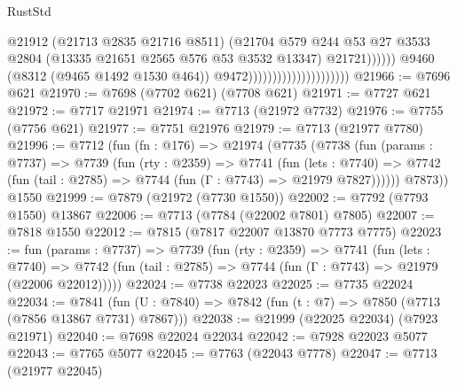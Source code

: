 \begin{lexlean}{RustStd}
\begin{coremodule}
                                                        @21912
                                                        (@21713 @2835 @21716 @8511)
                                                        (@21704
                                                          @579
                                                          @244
                                                          @53
                                                          @27
                                                          @3533
                                                          @2804
                                                          (@13335
                                                            @21651
                                                            @2565
                                                            @576
                                                            @53
                                                            @3532
                                                            @13347)
                                                          @21721))))))
                                              @9460
                                              (@8312 (@9465 @1492 @1530 @464))
                                              @9472)))))))))))))))))))))
@21966 := @7696 @621
@21970 := @7698 (@7702 @621) (@7708 @621)
@21971 := @7727 @621
@21972 := @7717 @21971
@21974 := @7713 (@21972 @7732)
@21976 := @7755 (@7756 @621)
@21977 := @7751 @21976
@21979 := @7713 (@21977 @7780)
@21996 := @7712
    (fun (fn : @176) =>
    @21974
      (@7735
        (@7738
          (fun (params : @7737) =>
          @7739
            (fun (rty : @2359) =>
            @7741
              (fun (lets : @7740) =>
              @7742 (fun (tail : @2785) => @7744 (fun (Γ : @7743) => @21979 @7827))))))
        @7873))
    @1550
@21999 := @7879 (@21972 (@7730 @1550))
@22002 := @7792 (@7793 @1550) @13867
@22006 := @7713 (@7784 (@22002 @7801) @7805)
@22007 := @7818 @1550
@22012 := @7815 (@7817 @22007 @13870 @7773 @7775)
@22023 := fun (params : @7737) =>
  @7739
    (fun (rty : @2359) =>
    @7741
      (fun (lets : @7740) =>
      @7742 (fun (tail : @2785) => @7744 (fun (Γ : @7743) => @21979 (@22006 @22012)))))
@22024 := @7738 @22023
@22025 := @7735 @22024
@22034 := @7841
    (fun (U : @7840) => @7842 (fun (t : @7) => @7850 (@7713 (@7856 @13867 @7731) @7867)))
@22038 := @21999 (@22025 @22034) (@7923 @21971)
@22040 := @7698 @22024 @22034
@22042 := @7928 @22023 @5077
@22043 := @7765 @5077
@22045 := @7763 (@22043 @7778)
@22047 := @7713 (@21977 @22045)

\end{coremodule}
\end{lexlean}
